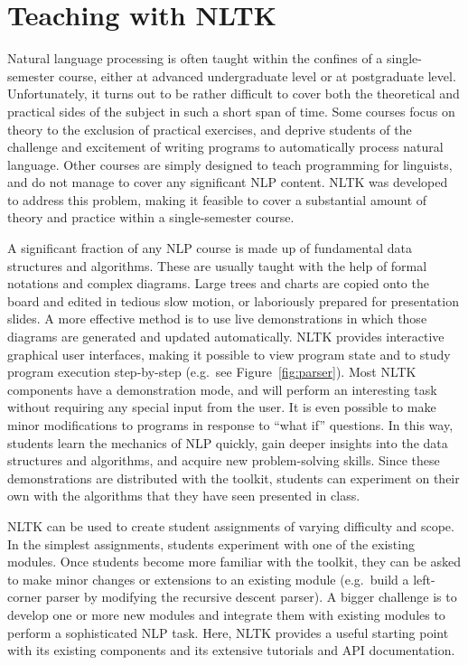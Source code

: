 \documentclass[11pt]{article}
\begin{document}
\section{Teaching with NLTK}

Natural language processing is often taught within the confines of a
single-semester course, either at advanced undergraduate level or at
postgraduate level.  Unfortunately, it turns out to be rather
difficult to cover both the theoretical and practical sides of the
subject in such a short span of time.  Some courses focus on theory to
the exclusion of practical exercises, and deprive students of the
challenge and excitement of writing programs to automatically process
natural language.  Other courses are simply designed to teach
programming for linguists, and do not manage to cover any significant
NLP content.  NLTK was developed to address this problem, making
it feasible to cover a substantial amount of theory and practice
within a single-semester course.

A significant fraction of any NLP course is made up of fundamental
data structures and algorithms.  These are usually taught with the
help of formal notations and complex diagrams.  Large trees and charts
are copied onto the board and edited in tedious slow motion, or
laboriously prepared for presentation slides.  A more effective method
is to use live demonstrations in which those diagrams are generated
and updated automatically.  NLTK provides interactive graphical user
interfaces, making it possible to view program state and to study
program execution step-by-step (e.g.\ see Figure~\ref{fig:parser}).
Most NLTK components have a demonstration mode, and will perform an
interesting task without requiring any special input from the user.
It is even possible to make minor modifications to programs in
response to ``what if'' questions.  In this way, students learn the
mechanics of NLP quickly, gain deeper insights into the data
structures and algorithms, and acquire new problem-solving skills.
Since these demonstrations are distributed with the toolkit, students
can experiment on their own with the algorithms that they have seen
presented in class.

NLTK can be used to create student assignments of varying difficulty
and scope. In the simplest assignments, students experiment with one
of the existing modules.  Once students become more familiar with the
toolkit, they can be asked to make minor changes or extensions to an
existing module (e.g.\ build a left-corner parser by modifying the
recursive descent parser).  A bigger challenge is to develop one or
more new modules and integrate them with existing modules to perform
a sophisticated NLP task.  Here, NLTK provides a useful starting
point with its existing components and its extensive tutorials and
API documentation.
\end{document}
